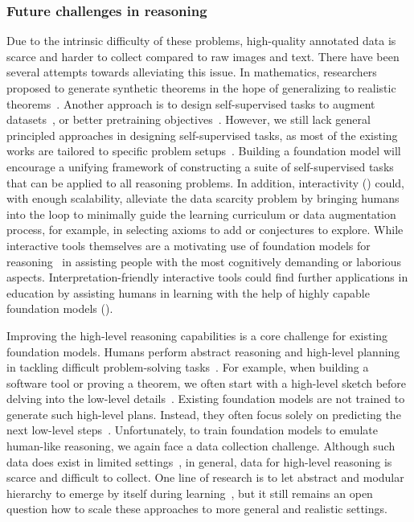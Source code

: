 \subsubsection{Future challenges in reasoning}
Due to the intrinsic difficulty of these problems, high-quality annotated data is scarce and harder to collect compared to raw images and text. 
There have been several attempts towards alleviating this issue. In mathematics, researchers proposed to generate synthetic theorems in the hope of generalizing to realistic theorems~\citep{DBLP:conf/nips/WangD20,wu2021int,vlad2021mathai,refactor}. Another approach is to design self-supervised tasks to augment datasets~\citep{yasunaga2020repair,ren2020query2box,pact,DBLP:journals/corr/abs-2102-07492,yasunaga2021break}, or better pretraining objectives~\citep{lime}. However, we still lack general principled approaches in designing self-supervised tasks, as most of the existing works are tailored to specific problem setups~\citep{yasunaga2020repair,ren2020beta,pact}. 
Building a foundation model will encourage a unifying framework of constructing a suite of self-supervised tasks that can be applied to all reasoning problems. 
In addition, interactivity () could, with enough scalability, alleviate the data scarcity problem by bringing humans into the loop to minimally guide the learning curriculum or data augmentation process, for example, in selecting axioms to add or conjectures to explore. While interactive tools themselves are a motivating use of foundation models for reasoning~\citep{pact,chen2021evaluating} in assisting people with the most cognitively demanding or laborious aspects. Interpretation-friendly interactive tools could find further applications in education by assisting humans in learning with the help of highly capable foundation models (). 

Improving the high-level reasoning capabilities is a core challenge for existing foundation models. Humans perform abstract reasoning and high-level planning in tackling difficult problem-solving tasks~\citep{MillerGalanterPribram60}. 
For example, when building a software tool or proving a theorem, we often start with a high-level sketch before delving into the low-level details~\cite{KOEDINGER1990511}. 
Existing foundation models are not trained to generate such high-level plans. Instead, they often focus solely on predicting the next low-level steps~\citep{DBLP:journals/corr/polu2020generative, pact, chen2021evaluating}. Unfortunately, to train foundation models to emulate human-like reasoning, we again face a data collection challenge. Although such data does exist in limited settings~\citep{li2021isarstep}, in general, data for high-level reasoning is scarce and difficult to collect. One line of research is to let abstract and modular hierarchy to emerge by itself during learning~\citep{DBLP:conf/pldi/EllisWNSMHCST21,hong21latent}, but it still remains an open question how to scale these approaches to more general and realistic settings. 

